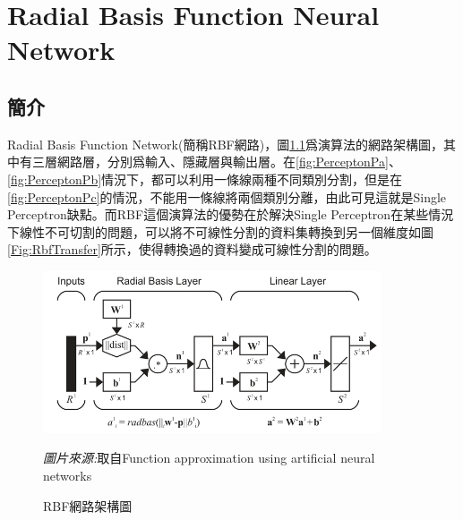 \chapter{Radial Basis Function Neural Network}
\label{chapter:rbf}
\section{簡介}
Radial Basis Function Network(簡稱RBF網路)，圖\ref{fig:RbfNetwork}爲演算法的網路架構圖，其中有三層網路層，分別爲輸入、隱藏層與輸出層。在\ref{fig:PerceptonPa}、\ref{fig:PerceptonPb}情況下，都可以利用一條線兩種不同類別分割，但是在\ref{fig:PerceptonPc}的情況，不能用一條線將兩個類別分離，由此可見這就是Single Perceptron缺點。而RBF這個演算法的優勢在於解決Single Perceptron在某些情況下線性不可切割的問題，可以將不可線性分割的資料集轉換到另一個維度如圖\ref{Fig:RbfTransfer}所示，使得轉換過的資料變成可線性分割的問題。
\begin{figure}[htbp]
	\centering
	\centerline{\includegraphics[width=10cm]{pic/rbf_architecture.jpg}}
	\caption{RBF網路架構圖}
	\begin{minipage}{.7\linewidth}
		\footnotesize
		\emph{圖片來源:}取自Function approximation using artificial neural networks
	\end{minipage}
	\label{fig:RbfNetwork}
\end{figure}

